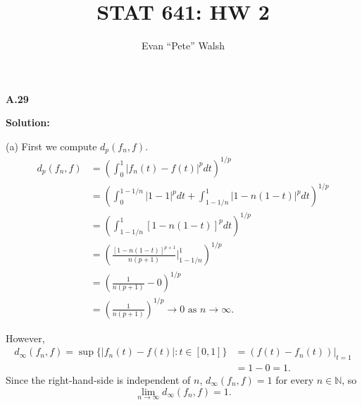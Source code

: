 \documentclass[12pt]{article}
\title{STAT 641: HW 2}
\author{Evan ``Pete'' Walsh}
\begin{document}
\maketitle

{\bf A.29}

{\bf Solution:}

(a) First we compute $d_{p}(f_{n}, f)$.
\begin{align*}
d_{p}(f_{n}, f) & = \left( \int_{0}^{1}|f_{n}(t) - f(t)|^{p}dt \right)^{1/p} \\
& = \left( \int_{0}^{1-1/n}|1-1|^{p}dt + \int_{1-1/n}^{1}|1-n(1-t)|^{p}dt \right)^{1/p} \\
& = \left( \int_{1-1/n}^{1}[1-n(1-t)]^{p}dt \right)^{1/p} \\
& = \left( \frac{[1-n(1-t)]^{p+1}}{n(p+1)}\bigg|_{1-1/n}^{1} \right)^{1/p} \\
& = \left( \frac{1}{n(p+1)} - 0 \right)^{1/p} \\
& = \left( \frac{1}{n(p+1)} \right)^{1/p} \rightarrow 0 \text{ as } n \rightarrow \infty.
\end{align*}

However,
\begin{align*}
d_{\infty}(f_{n},f) = \sup\{|f_{n}(t) - f(t)| : t \in [0,1]\} & = \left( f(t) - f_{n}(t) \right)\bigg|_{t=1} \\
& = 1 - 0 = 1.
\end{align*}
Since the right-hand-side is independent of $n$, $d_{\infty}(f_{n}, f) = 1$ for every $n \in \mathbb{N}$, so 
\[ \lim_{n\rightarrow \infty}d_{\infty}(f_{n}, f) = 1. \]
\end{document}
